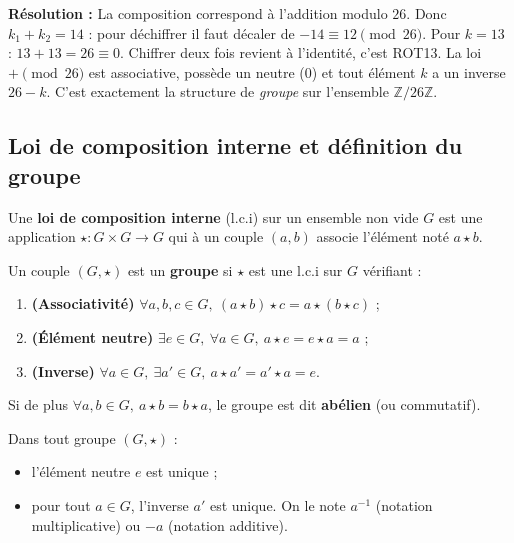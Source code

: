 \textbf{Résolution :}
La composition correspond à l'addition modulo $26$. Donc $k_1 + k_2 = 14$ : pour déchiffrer il faut décaler de $-14 \equiv 12 \pmod{26}$.
Pour $k = 13$ : $13 + 13 = 26 \equiv 0$. Chiffrer deux fois revient à l'identité, c'est ROT13.
La loi $+ \pmod{26}$ est associative, possède un neutre ($0$) et tout élément $k$ a un inverse $26 - k$. C'est exactement la structure de \emph{groupe} sur l'ensemble $\mathbb{Z}/26\mathbb{Z}$.

\subsection{Loi de composition interne et définition du groupe}

\begin{definition}
Une \textbf{loi de composition interne} (l.c.i) sur un ensemble non vide $G$ est une application $\star : G \times G \to G$ qui à un couple $(a, b)$ associe l'élément noté $a \star b$.
\end{definition}

\begin{definition}[Groupe]
Un couple $(G, \star)$ est un \textbf{groupe} si $\star$ est une l.c.i sur $G$ vérifiant :
\begin{enumerate}
    \item \textbf{(Associativité)} $\forall a, b, c \in G,\ (a \star b) \star c = a \star (b \star c)$ ;
    \item \textbf{(Élément neutre)} $\exists e \in G,\ \forall a \in G,\ a \star e = e \star a = a$ ;
    \item \textbf{(Inverse)} $\forall a \in G,\ \exists a' \in G,\ a \star a' = a' \star a = e$.
\end{enumerate}
Si de plus $\forall a, b \in G,\ a \star b = b \star a$, le groupe est dit \textbf{abélien} (ou commutatif).
\end{definition}

\begin{proposition}
Dans tout groupe $(G, \star)$ :
\begin{itemize}
    \item l'élément neutre $e$ est unique ;
    \item pour tout $a \in G$, l'inverse $a'$ est unique. On le note $a^{-1}$ (notation multiplicative) ou $-a$ (notation additive).
\end{itemize}
\end{proposition}


